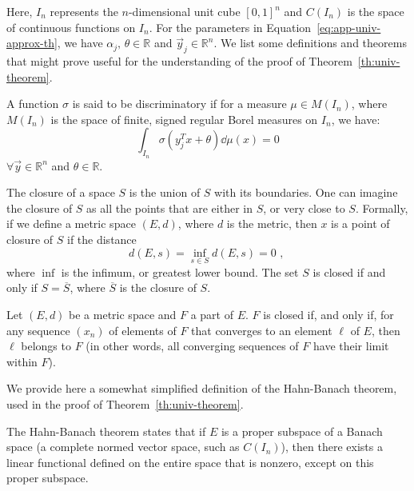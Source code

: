 Here, $I_n$ represents the $n$-dimensional unit cube $[0, 1]^n$ and $C(I_n)$ is the space of continuous functions on $I_n$. For the parameters in Equation~\eqref{eq:app-univ-approx-th}, we have $\alpha_j \text{, } \theta \in \mathbb{R}$ and $\Vec{y}_j \in \mathbb{R}^n$.
We list some definitions and theorems that might prove useful for the understanding of the proof of Theorem~\ref{th:univ-theorem}.
\begin{definition}
\label{def:fct-discriminatoire}
A function $\sigma$ is said to be discriminatory if for a measure $\mu \in M(I_n)$, where $M(I_n)$ is the space of finite, signed regular Borel measures on $I_n$, we have:
\begin{equation*}
\int_{I_n} \sigma \left( y_j^T x + \theta \right) \dd \mu(x) = 0
\end{equation*}
$\forall \Vec{y} \in \mathbb{R}^n$ and $\theta \in \mathbb{R}$.
\end{definition}
\begin{definition}
The closure of a space $S$ is the union of $S$ with its boundaries. One can imagine the closure of $S$ as all the points that are either in $S$, or very close to $S$. Formally, if we define a metric space $(E, d)$, where $d$ is the metric, then $x$ is a point of closure of $S$ if the distance
\begin{equation}
\label{eq:app-distance-closure}
d(E, s) = \inf_{s \in S} d(E, s)=0\text{ , }
\end{equation}
where $\inf$ is the infimum, or greatest lower bound. The set $S$ is closed if and only if $S = \overline{S}$, where $\overline{S}$ is the closure of $S$.
\end{definition}

\begin{theorem}
Let $(E,d)$ be a metric space and $F$ a part of $E$. $F$ is closed if, and only if, for any sequence $(x_n)$ of elements of $F$ that converges to an element $\ell$ of $E$, then $\ell$ belongs to $F$ (in other words, all converging sequences of $F$ have their limit within $F$).
\end{theorem}

We provide here a somewhat simplified definition of the Hahn-Banach theorem, used in the proof of Theorem~\ref{th:univ-theorem}.

\begin{theorem}
\label{th:HB}
The Hahn-Banach theorem states that if $E$ is a proper subspace of a Banach space (a complete normed vector space, such as $C(I_n)$), then there exists a linear functional defined on the entire space that is nonzero, except on this proper subspace.
\end{theorem}

